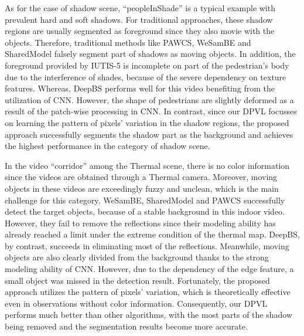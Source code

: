 \documentclass[journal]{IEEEtran}
\begin{document}
As for the case of shadow scene, ``peopleInShade'' is a typical example with prevalent hard and soft shadows. 
For traditional approaches, these shadow regions are usually segmented as foreground since they also movie with the objects. 
Therefore, traditional methods like PAWCS, WeSamBE and SharedModel falsely segment part of shadows as moving objects. 
In addition, the foreground provided by IUTIS-5 is incomplete on part of the pedestrian's body due to the interference of shades, 
because of the severe dependency on texture features. 
Whereas, DeepBS performs well for this video benefiting from the utilization of CNN. 
However, the shape of pedestrians are slightly deformed as a result of the patch-wise processing in CNN. 
In contrast, since our DPVL focusses on learning the pattern of pixels' variation in the shadow regions, 
the proposed approach successfully segments the shadow part as the background and achieves the highest performance in the category of shadow scene.

In the video ``corridor'' among the Thermal scene, there is no color information since the videos are obtained through a Thermal camera. 
Moreover, moving objects in these videos are exceedingly fuzzy and unclean, which is the main challenge for this category. 
WeSamBE, SharedModel and PAWCS successfully detect the target objects, because of a stable background in this indoor video. 
However, they fail to remove the reflections since their modeling ability has already reached a limit under the extreme condition of the thermal map. 
DeepBS, by contrast, succeeds in eliminating most of the reflections. 
Meanwhile, moving objects are also clearly divided from the background thanks to the strong modeling ability of CNN. 
However, due to the dependency of the edge feature, a small object was missed in the detection result. 
Fortunately, the proposed approach utilizes the pattern of pixels' variation, which is theoretically effective even in observations without color information. 
Consequently, our DPVL performs much better than other algorithms, with the most parts of the shadow being removed and the segmentation results become more accurate.
\end{document}
